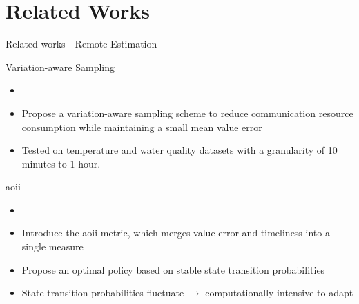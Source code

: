 \documentclass[9pt]{beamer}
\begin{document}
\section{Related Works}

\begin{frame}{Related works - Remote Estimation}
    \begin{block}{Variation-aware Sampling}
        \begin{itemize}
            \item {}
            \item Propose a \alert{variation-aware} sampling scheme to reduce communication resource consumption while maintaining a small mean value error
            \item Tested on temperature and water quality datasets with a granularity of \alert{10 minutes to 1 hour}.
        \end{itemize}
    \end{block}
    \begin{block}{\gls{aoii}}
        \begin{itemize}
            \item {}
            \item Introduce the \gls{aoii} metric, which merges \alert{value error} and \alert{timeliness} into a single measure
            \item Propose an optimal policy based on \alert{stable} state transition probabilities
            \item State transition probabilities fluctuate $\rightarrow$ computationally intensive to adapt
        \end{itemize}
    \end{block}
\end{frame}
\end{document}
